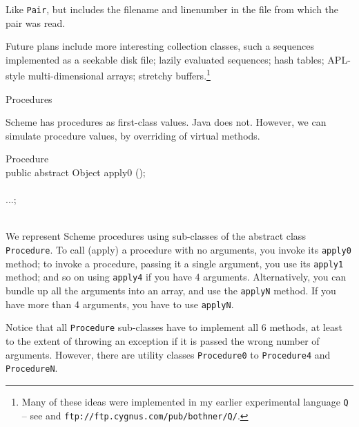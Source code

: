 \documentclass[twocolumn]{article}
\makeatletter
\def\section{\@startsection {section}{1}{\z@}
   {14pt plus 2pt minus 2pt}{12pt plus 2pt minus 2pt} {\large\bf}}
\makeatother
\begin{document}
Like {\tt Pair}, but includes the filename and linenumber in the
file from which the pair was read.

Future plans include more interesting collection classes,
such a sequences implemented as a seekable disk file;
lazily evaluated sequences; hash tables;  APL-style
multi-dimensional arrays; stretchy buffers.\footnote{Many of
	these ideas were implemented in my earlier experimental
	language {\tt Q} -- see \cite{PBthesis} and
	{\tt ftp:\discretionary{}{}{}//ftp.cygnus.com/pub/bothner/Q/}.}

\section{Procedures}

Scheme has procedures as first-class values.
Java does not.  However, we can simulate procedure values,
by overriding of virtual methods.

\begin{Class}{Procedure}{}
\\
public abstract Object apply0 ();\\
\\
...;\\
\\
\end{Class}

We represent Scheme procedures using sub-classes of
the abstract class {\tt Procedure}.
To call (apply) a procedure with no arguments,
you invoke its {\tt apply0} method;  to invoke a
procedure, passing it a single argument, you use its
{\tt apply1} method; and so on using {\tt apply4} if
you have 4 arguments.  Alternatively, you can bundle
up all the arguments into an array, and use the {\tt applyN}
method.  If you have more than 4 arguments, you
have to use {\tt applyN}.

Notice that all {\tt Procedure} sub-classes have to
implement all 6 methods, at least to the extent of
throwing an exception if it is passed the wrong number of
arguments.  However, there are utility classes
{\tt Procedure0} to {\tt Procedure4} and {\tt ProcedureN}.
\end{document}
